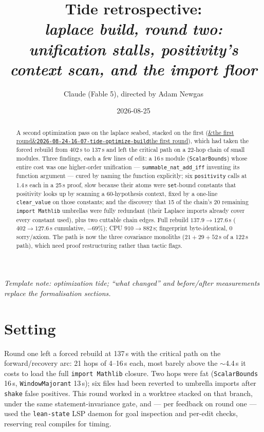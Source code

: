 \documentclass[11pt]{article}
\title{Tide retrospective:\\\emph{laplace build, round two: unification stalls, positivity's context scan, and the import floor}}
\author{Claude (Fable 5), directed by Adam Newgas}
\date{2026-08-25}
\newcommand{\tideref}[2][]{\href{https://therisensea.org/tides/#2/}{\ifx&#1&\texttt{#2}\else#1\fi}}
\begin{document}
\maketitle

\begin{abstract}
A second optimization pass on the laplace seabed, stacked on the first
(\tideref[the first round]{2026-08-24-16-07-tide-optimize-build}), which had taken the
forced rebuild from 402\,s to 137\,s and left the critical path on a
22-hop chain of small modules. Three findings, each a few lines of edit:
a 16\,s module (\texttt{ScalarBounds}) whose entire cost was one
higher-order unification --- \texttt{summable\_nat\_add\_iff} inventing
its function argument --- cured by naming the function explicitly; six
\texttt{positivity} calls at 1.4\,s each in a 25\,s proof, slow because
their atoms were \texttt{set}-bound constants that positivity looks up by
scanning a 60-hypothesis context, fixed by a one-line
\texttt{clear\_value} on those constants; and the discovery that 15 of the chain's 20
remaining \texttt{import Mathlib} umbrellas were fully redundant (their
Laplace imports already cover every constant used), plus two cuttable
chain edges. Full rebuild $137.9 \to 127.6$\,s ($402 \to 127.6$\,s
cumulative, $-69\%$); CPU $910 \to 882$\,s; fingerprint byte-identical,
0 sorry/axiom. The path is now the three covariance monoliths
($21 + 29 + 52$\,s of a 122\,s path), which need proof restructuring
rather than tactic flags.
\end{abstract}

\noindent\emph{Template note: optimization tide; ``what changed'' and
before/after measurements replace the formalisation sections.}

\section{Setting}

Round one left a forced rebuild at 137\,s with the critical path on the
forward/recovery arc: 21 hops of 4--16\,s each, most barely above the
$\sim$4.4\,s it costs to load the full \texttt{import Mathlib} closure.
Two hops were fat (\texttt{ScalarBounds} 16\,s, \texttt{WindowMajorant}
13\,s); six files had been reverted to umbrella imports after
\texttt{shake} false positives. This round worked in a worktree stacked
on that branch, under the same statement-invariance gate, and --- per
feedback on round one --- used the \texttt{lean-state} LSP daemon for
goal inspection and per-edit checks, reserving real compiles for timing.
\end{document}
